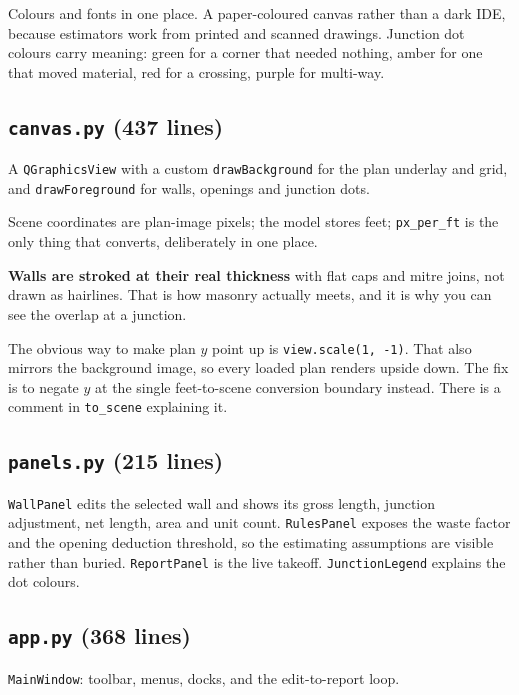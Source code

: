 \documentclass[11pt,letterpaper]{article}
\newcommand{\code}[1]{\texttt{\small #1}}
\begin{document}
Colours and fonts in one place. A paper-coloured canvas rather than a dark
IDE, because estimators work from printed and scanned drawings. Junction dot
colours carry meaning: green for a corner that needed nothing, amber for one
that moved material, red for a crossing, purple for multi-way.

\subsection{\texttt{canvas.py} (437 lines)}

A \code{QGraphicsView} with a custom \code{drawBackground} for the plan
underlay and grid, and \code{drawForeground} for walls, openings and
junction dots.

Scene coordinates are plan-image pixels; the model stores feet;
\code{px\_per\_ft} is the only thing that converts, deliberately in one
place.

\textbf{Walls are stroked at their real thickness} with flat caps and mitre
joins, not drawn as hairlines. That is how masonry actually meets, and it is
why you can see the overlap at a junction.

\begin{keypoint}
The obvious way to make plan $y$ point up is \code{view.scale(1, -1)}. That
also mirrors the background image, so every loaded plan renders upside down.
The fix is to negate $y$ at the single feet-to-scene conversion boundary
instead. There is a comment in \code{to\_scene} explaining it.
\end{keypoint}

\subsection{\texttt{panels.py} (215 lines)}

\code{WallPanel} edits the selected wall and shows its gross length, junction
adjustment, net length, area and unit count. \code{RulesPanel} exposes the
waste factor and the opening deduction threshold, so the estimating
assumptions are visible rather than buried. \code{ReportPanel} is the live
takeoff. \code{JunctionLegend} explains the dot colours.

\subsection{\texttt{app.py} (368 lines)}

\code{MainWindow}: toolbar, menus, docks, and the edit-to-report loop.
\end{document}
